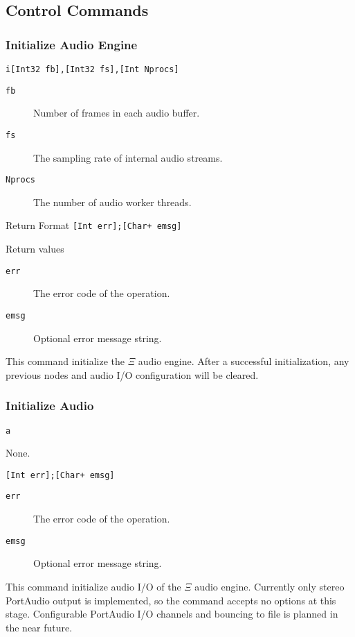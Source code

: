 \documentclass{report}
\newcommand{\Ksi}{$\Xi$ }
\newcommand{\inlinecode}[1]{\begin{mdframed}[backgroundcolor=black!10]#1\end{mdframed}}
\begin{document}
\subsection{Control Commands}\label{sec:rpc}
\subsubsection{Initialize Audio Engine}
\inlinecode{
\begin{description}\sloppy
\item[Command Format] \lstinline{i[Int32 fb],[Int32 fs],[Int Nprocs]}
\item[Command Arguments]\hfill
  \begin{description}
  \item[\texttt{fb}] Number of frames in each audio buffer.
  \item[\texttt{fs}] The sampling rate of internal audio streams.
  \item[\texttt{Nprocs}] The number of audio worker threads.
  \end{description}
\item[Return Format] \lstinline|[Int err];[Char+ emsg]|
\item[Return values]\hfill
  \begin{description}
  \item[\texttt{err}] The error code of the operation.
  \item[\texttt{emsg}] Optional error message string.
  \end{description}
\end{description}}\par
This command initialize the \Ksi audio engine. After a successful initialization, any previous nodes and audio I/O configuration will be cleared.
\subsubsection{Initialize Audio}
\inlinecode{
\begin{description}\sloppy
\item[Command Format] \lstinline{a}
\item[Command Arguments] None.
\item[Return Format] \lstinline|[Int err];[Char+ emsg]|
\item[Return values]\hfill
  \begin{description}
  \item[\texttt{err}] The error code of the operation.
  \item[\texttt{emsg}] Optional error message string.
  \end{description}
\end{description}}\par
This command initialize audio I/O of the \Ksi audio engine. Currently only stereo PortAudio output is implemented, so the command accepts no options at this stage. Configurable PortAudio I/O channels and bouncing to file is planned in the near future.
\end{document}
